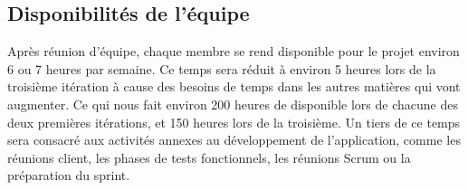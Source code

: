 \documentclass[hidelinks, 10pt,a4paper]{article}
\begin{document}
\subsection{Disponibilités de l'équipe}
Après réunion d'équipe, chaque membre se rend disponible pour le projet environ
6 ou 7 heures par semaine. Ce temps sera réduit à environ 5 heures lors de la troisième
itération à cause des besoins de temps dans les autres matières qui vont augmenter.
Ce qui nous fait environ 200 heures de disponible lors de chacune des deux premières itérations,
et 150 heures lors de la troisième.
Un tiers de ce temps sera consacré aux activités annexes au développement de l'application,
comme les réunions client, les phases de tests fonctionnels, les réunions Scrum ou la préparation
du sprint.
\end{document}
